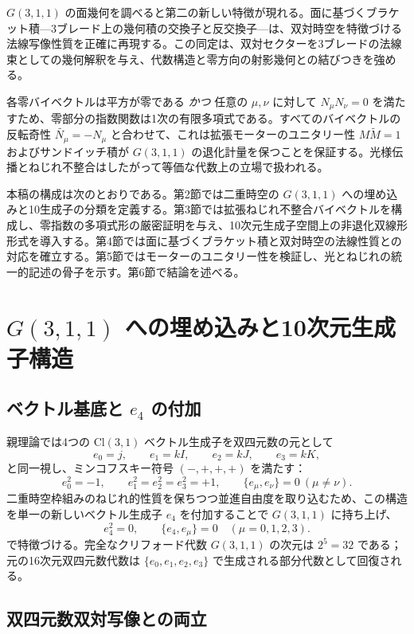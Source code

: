 \documentclass[11pt,a4paper]{article}
\begin{document}
$G(3,1,1)$ の面幾何を調べると第二の新しい特徴が現れる。面に基づくブラケット積---3ブレード上の幾何積の交換子と反交換子---は、双対時空を特徴づける法線写像性質を正確に再現する。この同定は、双対セクターを3ブレードの法線束としての幾何解釈を与え、代数構造と零方向の射影幾何との結びつきを強める。

各零バイベクトルは平方が零である \emph{かつ} 任意の $\mu,\nu$ に対して $N_{\mu}N_{\nu}=0$ を満たすため、零部分の指数関数は1次の有限多項式である。すべてのバイベクトルの反転奇性 $\widetilde{N_{\mu}}=-N_{\mu}$ と合わせて、これは拡張モーターのユニタリー性 $M\widetilde{M}=1$ およびサンドイッチ積が $G(3,1,1)$ の退化計量を保つことを保証する。光様伝播とねじれ不整合はしたがって等価な代数上の立場で扱われる。

本稿の構成は次のとおりである。第2節では二重時空の $G(3,1,1)$ への埋め込みと10生成子の分類を定義する。第3節では拡張ねじれ不整合バイベクトルを構成し、零指数の多項式形の厳密証明を与え、10次元生成子空間上の非退化双線形形式を導入する。第4節では面に基づくブラケット積と双対時空の法線性質との対応を確立する。第5節ではモーターのユニタリー性を検証し、光とねじれの統一的記述の骨子を示す。第6節で結論を述べる。

\section{$G(3,1,1)$ への埋め込みと10次元生成子構造}

\subsection{ベクトル基底と $e_{4}$ の付加}

親理論では4つの $\mathrm{Cl}(3,1)$ ベクトル生成子を双四元数の元として
\[
e_{0}=j,\qquad e_{1}=kI,\qquad e_{2}=kJ,\qquad e_{3}=kK,
\]
と同一視し、ミンコフスキー符号 $(-,+,+,+)$ を満たす：
\[
e_{0}^{2}=-1,\qquad e_{1}^{2}=e_{2}^{2}=e_{3}^{2}=+1,\qquad \{e_{\mu},e_{\nu}\}=0\ (\mu\neq\nu).
\]
二重時空枠組みのねじれ的性質を保ちつつ並進自由度を取り込むため、この構造を単一の新しいベクトル生成子 $e_{4}$ を付加することで $G(3,1,1)$ に持ち上げ、
\begin{equation}
e_{4}^{2}=0,\qquad \{e_{4},e_{\mu}\}=0\quad (\mu=0,1,2,3).
\label{eq:e4-defs}
\end{equation}
で特徴づける。完全なクリフォード代数 $G(3,1,1)$ の次元は $2^{5}=32$ である；元の16次元双四元数代数は $\{e_{0},e_{1},e_{2},e_{3}\}$ で生成される部分代数として回復される。

\subsection{双四元数双対写像との両立}
\end{document}
